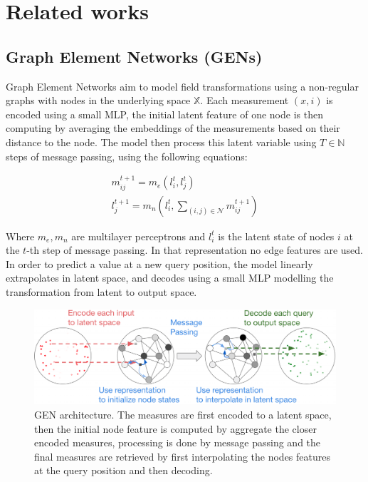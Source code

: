 \documentclass[a4paper,10pt]{article}
\begin{document}
\section{Related works}


\subsection{Graph Element Networks (GENs)} \label{ssec:gen}
Graph Element Networks \cite{alet2019gen} aim to model field transformations using a non-regular graphs with nodes in the underlying space $\mathbb{X}$. Each measurement $(x, i)$ is encoded using a small MLP, the initial latent feature of one node is then computing by averaging the embeddings of the measurements based on their distance to the node. The model then process this latent variable using $T \in \mathbb{N}$ steps of message passing, using the following equations:

\begin{align}
  m_{ij}^{t + 1} = m_e(l_{i}^{t}, l_{j}^{t}) \\
  l_{j}^{t + 1} = m_{n}(l_{i}^{t}, \sum_{(i,j) \in \mathcal{N}} m_{ij}^{t + 1})
\end{align}

Where $m_e, m_n$ are multilayer perceptrons and $l_{i}^{t}$ is the latent state of nodes $i$ at the $t$-th step of message passing. In that representation no edge features are used.
In order to predict a value at a new query position, the model linearly extrapolates in latent space, and decodes using a small MLP modelling the transformation from latent to output space.

\begin{figure}[htbp]
  \centering
  \includegraphics[width=\textwidth]{figs/GEN}
  \caption{GEN architecture. The measures are first encoded to a latent space, then the initial node feature is computed by aggregate the closer encoded measures, processing is done by message passing and the final measures are retrieved by first interpolating the nodes features at the query position and then decoding.}
\end{figure}
\end{document}

